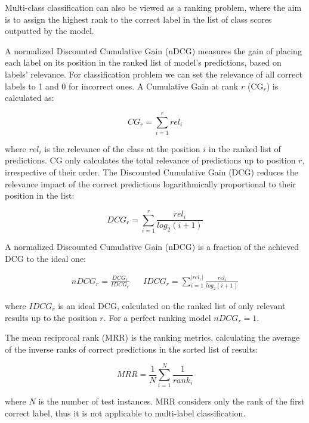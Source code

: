 Multi-class classification can also be viewed as a ranking problem, where the aim is to assign the highest rank to the correct label in the list of class scores outputted by the model. 

 A normalized Discounted Cumulative Gain (nDCG) measures the gain of placing each label on its position in the ranked list of model's predictions, based on labels' relevance. For classification problem we can set the relevance of all correct labels to 1 and 0 for incorrect ones. A Cumulative Gain at rank $r$ (CG$_r$) is calculated as:

\begin{equation}
    CG_r = \sum_{i=1}^r rel_i
\end{equation}

where $rel_i$ is the relevance of the class at the position $i$ in the ranked list of predictions. CG only calculates the total relevance of predictions up to position $r$, irrespective of their order. The Discounted Cumulative Gain (DCG) reduces the relevance impact of the correct predictions logarithmically proportional to their position in the list:

\begin{equation}
    DCG_r = \sum_{i=1}^r \frac{rel_i}{log_2(i+1)}
\end{equation}

A normalized Discounted Cumulative Gain (nDCG) is a fraction of the achieved DCG to the ideal one:

\begin{align}
    nDCG_r = \frac{DCG_r}{IDCG_r} && IDCG_r = \sum_{i=1}^{|rel_r|} \frac{rel_i}{log_2(i+1)}
\end{align}

where $IDCG_r$ is an ideal DCG, calculated on the ranked list of only relevant results up to the position $r$. For a perfect ranking model $nDCG_r = 1$.

 The mean reciprocal rank (MRR) is the ranking metrics, calculating the average of the inverse ranks of correct predictions in the sorted list of results:

\begin{equation}
    MRR = \frac{1}{N} \sum_{i=1}^N \frac{1}{rank_i}
\end{equation}

where $N$ is the number of test instances. MRR considers only the rank of the first correct label, thus it is not applicable to multi-label classification.
